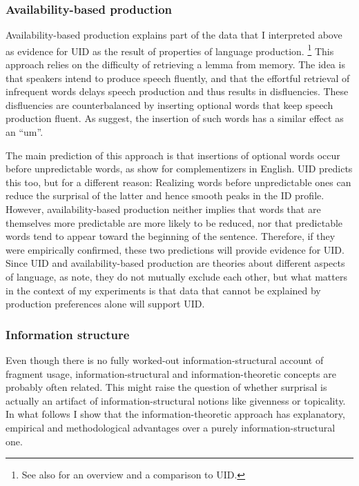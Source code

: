 \subsubsection{Availability-based production}
\label{sec:infotheory-uid-competing-abp}\largerpage

Availability-based production \citep[e.g.][]{bock1987, ferreira.dell2000} explains part of the data that I interpreted above as evidence for UID as the result of properties of language production.%
%
\footnote{See also \citet{jaeger.buz2017} for an overview and a comparison to UID.}\afterfn%
% 
This approach relies on the difficulty of retrieving a lemma from memory. The idea is that speakers intend to produce speech fluently, and that the effortful retrieval of infrequent words delays speech production and thus results in disfluencies. These disfluencies are counterbalanced by inserting optional words that keep speech production fluent. As \citet[299]{ferreira.dell2000} suggest, the insertion of such words has a similar effect as an ``um''.

The main prediction of this approach is that insertions of optional words occur before unpredictable words, as \citet{ferreira.dell2000} show for complementizers in English. UID predicts this too, but for a different reason: Realizing words before unpredictable ones can reduce the surprisal of the latter and hence smooth peaks in the ID profile. However, availability-based production neither implies that words that are themselves more predictable are more likely to be reduced, nor that predictable words tend to appear toward the beginning of the sentence. Therefore, if they were empirically confirmed, these two predictions will provide evidence for UID. Since UID and availability-based production are theories about different aspects of language, as \citet{jaeger.buz2017} note, they do not mutually exclude each other, but what matters in the context of my experiments is that data that cannot be explained by production preferences alone will support UID.

\subsubsection{Information structure}\largerpage[1.75]
Even though there is no fully worked-out information-structural account of fragment usage, information-structural and information-theoretic concepts are probably often related. This might raise the question of whether surprisal is actually an artifact of information-structural notions like givenness or topicality. In what follows I show that the information-theoretic approach has explanatory, empirical and methodological advantages over a purely information-structural one.

